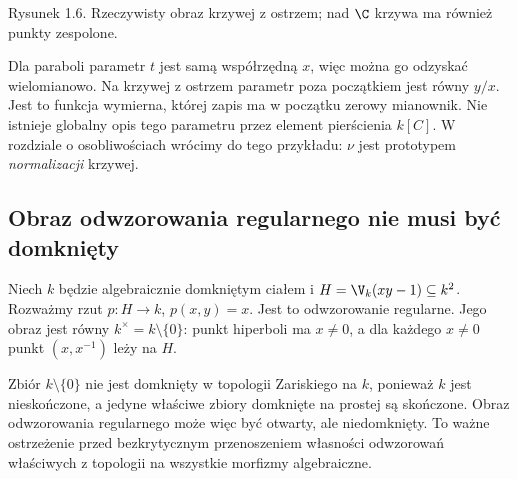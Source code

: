 \begin{center}
\end{center}
\begin{center}\small Rysunek 1.6. Rzeczywisty obraz krzywej z ostrzem; nad $\C$ krzywa ma również punkty zespolone.\end{center}

\begin{uwaga}
Dla paraboli parametr $t$ jest samą współrzędną $x$,
więc można go odzyskać wielomianowo. Na krzywej z ostrzem
parametr poza początkiem jest równy $y/x$.
Jest to funkcja wymierna, której zapis ma w początku
zerowy mianownik. Nie istnieje globalny opis tego parametru
przez element pierścienia $k[C]$.
W rozdziale o osobliwościach wrócimy do tego przykładu:
$\nu$ jest prototypem \emph{normalizacji} krzywej.
\end{uwaga}

\subsection{Obraz odwzorowania regularnego nie musi być domknięty}

\begin{przyklad}
Niech $k$ będzie algebraicznie domkniętym ciałem i
$H=\V_k(xy-1)\subseteq k^2$.
Rozważmy rzut $p:H\to k$, $p(x,y)=x$.
Jest to odwzorowanie regularne. Jego obraz jest równy
$k^\times=k\setminus\{0\}$: punkt hiperboli ma $x\ne0$,
a dla każdego $x\ne0$ punkt $(x,x^{-1})$ leży na $H$.

Zbiór $k\setminus\{0\}$ nie jest domknięty w topologii
Zariskiego na $k$, ponieważ $k$ jest nieskończone,
a jedyne właściwe zbiory domknięte na prostej są skończone.
Obraz odwzorowania regularnego może więc być otwarty, ale niedomknięty.
To ważne ostrzeżenie przed bezkrytycznym przenoszeniem własności
odwzorowań właściwych z topologii na wszystkie morfizmy algebraiczne.
\end{przyklad}

